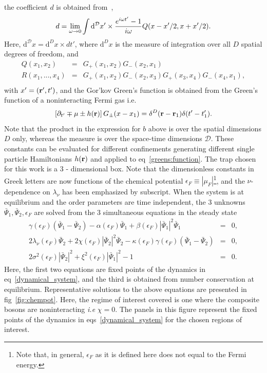 \documentclass[a4paper,10pt]{report}
\begin{document}
the coefficient $d$ is obtained from~\cite{machida:dynamics},
\begin{equation}
\label{d}
d=\lim_{\omega\rightarrow 0}\int{\mathrm d}^{\mathcal{D}}x'\times {e^{i\omega{t'}}-1\over i\omega} Q(x-x'/2,x+x'/2).
\end{equation} 
Here, ${\mathrm d}^{\mathcal{D}}x={\mathrm d}^Dx \times dt'$, where ${\mathrm d}^{D}x$ is the measure of integration over all $D$ spatial degrees of freedom, and 
\begin{eqnarray} 
Q(x_1,x_2) &=& G_+(x_1,x_2)G_-(x_2,x_1) \nonumber \\
R(x_1,...,x_4)&=&G_+(x_1,x_2)G_-(x_2,x_3)G_+(x_3,x_4)G_-(x_4,x_1),\nonumber \\
\end{eqnarray}
with $x'=({\bf r}',t')$, and the Gor'kov Green's function is obtained from the Green's function of a noninteracting Fermi gas i.e.
\begin{equation}
\label{greens:function}
 \left[ \partial_{t'} \mp \mu \pm h({\bf r}) \right] G_\pm(x-x_1) = \delta^D({\bf r}-{\bf r}_1) \delta(t'-t'_1).
\end{equation}
Note that the product in the expression for $b$ above is over the spatial dimensions $D$ only, whereas the measure is over the space-time dimensions $\mathcal{D}$. These constants can be evaluated for different confinements generating different single particle Hamiltonians $h({\bf r})$ and applied to eq\ \ref{greens:function}. The trap chosen for this work is a $3$ - dimensional box. Note that the dimensionless constants in Greek letters are now functions of the chemical potential $\epsilon_F\equiv|\mu_F|$\footnote{Note that, in general, $\epsilon_F$ as it is defined here does not equal to the Fermi energy.}, and the $\nu$-dependence on $\lambda_\nu$ has been emphasized by subscript.
When the system is at equilibrium and the order parameters are time independent, the 3 unknowns $ \bar{\Psi}_1, \bar{\Psi}_2,\epsilon_F$ are solved from the 3 simultaneous equations in the steady state
\begin{eqnarray}
\label{fixedpoints}
\gamma\left(\epsilon_F\right) \left(  \bar{\Psi}_1- \bar{\Psi}_2 \right) - \alpha\left(\epsilon_F\right)  \bar{\Psi}_1 +\beta\left(\epsilon_F\right) | \bar{\Psi}_1|^2  \bar{\Psi}_1 &=& 0, \nonumber \\
2\lambda_\nu\left(\epsilon_F\right)  \bar{\Psi}_2 +2 \chi\left(\epsilon_F\right)| \bar{\Psi}_2|^2 \bar{\Psi}_2 - \kappa\left(\epsilon_F\right)\gamma\left(\epsilon_F\right) \left( \bar{\Psi}_1- \bar{\Psi}_2 \right) &=& 0, \nonumber \\
2 \sigma^2(\epsilon_F) | \bar{\Psi}_2|^2 + \xi^2(\epsilon_F) | \bar{\Psi}_1|^2 -1 &=& 0.
\end{eqnarray}
Here, the first two equations are fixed points of the dynamics in eq\ \ref{dynamical_system}, and the third is obtained from number conservation at equilibrium. Representative solutions to the above equations are presented in fig\ \ref{fig:chempot}. Here, the regime of interest covered is one where the composite bosons are noninteracting \textit{i.e} $\chi=0$. The panels in this figure represent the fixed points of the dynamics in eqs\ \ref{dynamical_system} for the chosen regions of interest.
\end{document}
